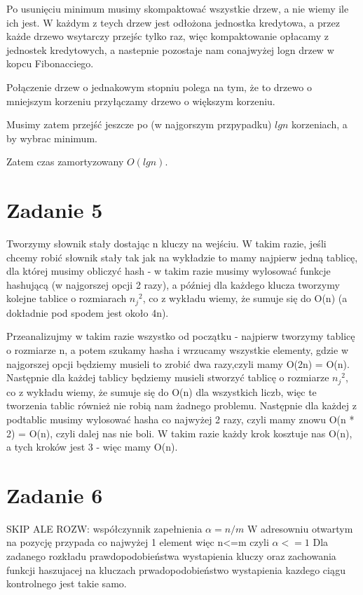 \documentclass[12pt]{article}
\begin{document}
Po usunięciu minimum musimy skompaktować wszystkie drzew, a nie wiemy ile ich jest. W każdym z teych drzew jest odłożona jednostka kredytowa, a przez każde drzewo wsytarczy przejśc tylko raz, więc kompaktowanie opłacamy z jednostek kredytowych, a nastepnie pozostaje nam conajwyżej logn drzew w kopcu Fibonacciego.

Połączenie drzew o jednakowym stopniu polega na tym, że to drzewo o mniejszym korzeniu przyłączamy drzewo o większym korzeniu.

Musimy zatem przejść jeszcze po (w najgorszym przpypadku) $lgn$ korzeniach, a by wybrac minimum.

Zatem czas zamortyzowany $O(lgn)$.

\section{Zadanie 5}

Tworzymy słownik stały dostając n kluczy na wejściu.
W takim razie, jeśli chcemy robić słownik stały tak jak na wykładzie to mamy najpierw jedną tablicę, dla której musimy obliczyć hash - w takim razie musimy wylosować funkcje hashującą (w najgorszej opcji 2 razy), a później dla każdego klucza tworzymy kolejne tablice o rozmiarach ${n_j}^2$, co z wykładu wiemy, że sumuje się do O(n) (a dokładnie pod spodem jest około 4n).

Przeanalizujmy w takim razie wszystko od początku - najpierw tworzymy tablicę o rozmiarze n, a potem szukamy hasha i wrzucamy wszystkie elementy, gdzie w najgorszej opcji będziemy musieli to zrobić dwa razy,czyli mamy O(2n) = O(n).
Następnie dla każdej tablicy będziemy musieli stworzyć tablicę o rozmiarze ${n_j}^2$, co z wykładu wiemy, że sumuje się do O(n) dla wszystkich liczb, więc te tworzenia tablic również nie robią nam żadnego problemu. 
Następnie dla każdej z podtablic musimy wylosować hasha co najwyżej 2 razy, czyli mamy znowu O(n * 2) = O(n), czyli dalej nas nie boli.
W takim razie każdy krok kosztuje nas O(n), a tych kroków jest 3 - więc mamy O(n).

\section{Zadanie 6} SKIP ALE ROZW:
współczynnik zapełnienia $\alpha = n/m$
W adresowniu otwartym na pozycję przypada co najwyżej 1 element więc n<=m czyli $\alpha <= 1$
Dla zadanego rozkładu prawdopodobieństwa wystapienia kluczy oraz zachowania funkcji haszujacej na kluczach prwadopodobieństwo wystapienia kazdego ciągu kontrolnego jest takie samo.
\end{document}
